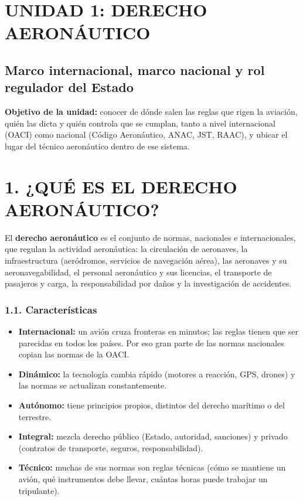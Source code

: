 \clearpage
\section*{UNIDAD 1: DERECHO AERONÁUTICO}
\subsection*{Marco internacional, marco nacional y rol regulador del Estado}

\begin{recuadro}
\textbf{Objetivo de la unidad:} conocer de dónde salen las reglas que rigen la aviación, quién
las dicta y quién controla que se cumplan, tanto a nivel internacional (OACI) como nacional
(Código Aeronáutico, ANAC, JST, RAAC), y ubicar el lugar del técnico aeronáutico dentro de ese
sistema.
\end{recuadro}

\section*{1. ¿QUÉ ES EL DERECHO AERONÁUTICO?}

El \textbf{derecho aeronáutico} es el conjunto de normas, nacionales e internacionales, que
regulan la actividad aeronáutica: la circulación de aeronaves, la infraestructura (aeródromos,
servicios de navegación aérea), las aeronaves y su aeronavegabilidad, el personal aeronáutico y
sus licencias, el transporte de pasajeros y carga, la responsabilidad por daños y la
investigación de accidentes.

\subsubsection*{1.1. Características}
\begin{itemize}
  \item \textbf{Internacional:} un avión cruza fronteras en minutos; las reglas tienen que ser
        parecidas en todos los países. Por eso gran parte de las normas nacionales copian las
        normas de la OACI.
  \item \textbf{Dinámico:} la tecnología cambia rápido (motores a reacción, GPS, drones) y las
        normas se actualizan constantemente.
  \item \textbf{Autónomo:} tiene principios propios, distintos del derecho marítimo o del
        terrestre.
  \item \textbf{Integral:} mezcla derecho público (Estado, autoridad, sanciones) y privado
        (contratos de transporte, seguros, responsabilidad).
  \item \textbf{Técnico:} muchas de sus normas son reglas técnicas (cómo se mantiene un avión,
        qué instrumentos debe llevar, cuántas horas puede trabajar un tripulante).
\end{itemize}

